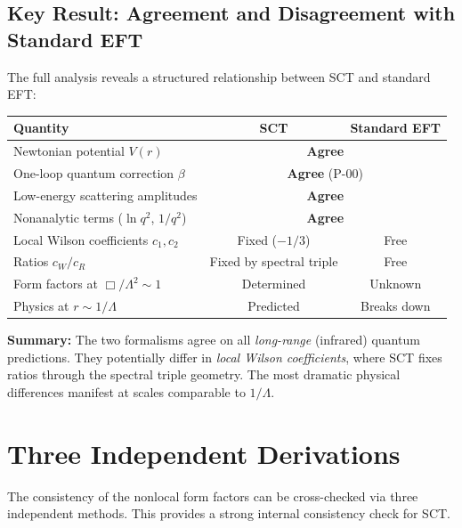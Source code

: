 \documentclass[11pt,a4paper]{article}
\begin{document}
\subsection{Key Result: Agreement and Disagreement with Standard EFT}

The full analysis reveals a structured relationship between SCT and standard EFT:

\begin{center}
\renewcommand{\arraystretch}{1.4}
\begin{tabular}{p{6cm}cc}
  \toprule
  \textbf{Quantity} & \textbf{SCT} & \textbf{Standard EFT} \\
  \midrule
  Newtonian potential $V(r)$ & \multicolumn{2}{c}{\textbf{Agree}} \\
  One-loop quantum correction $\beta$ & \multicolumn{2}{c}{\textbf{Agree} (P-00)} \\
  Low-energy scattering amplitudes & \multicolumn{2}{c}{\textbf{Agree}} \\
  Nonanalytic terms ($\ln q^2$, $1/q^2$) & \multicolumn{2}{c}{\textbf{Agree}} \\
  \midrule
  Local Wilson coefficients $c_1, c_2$ & Fixed ($-1/3$) & Free \\
  Ratios $c_W/c_R$ & Fixed by spectral triple & Free \\
  Form factors at $\Box/\Lambda^2 \sim 1$ & Determined & Unknown \\
  Physics at $r \sim 1/\Lambda$ & Predicted & Breaks down \\
  \bottomrule
\end{tabular}
\end{center}

\vspace{0.5em}
\noindent
\textbf{Summary:} The two formalisms agree on all \emph{long-range} (infrared) quantum predictions. They potentially differ in \emph{local Wilson coefficients}, where SCT fixes ratios through the spectral triple geometry. The most dramatic physical differences manifest at scales comparable to $1/\Lambda$.

\section{Three Independent Derivations}

The consistency of the nonlocal form factors can be cross-checked via three independent methods. This provides a strong internal consistency check for SCT.
\end{document}
